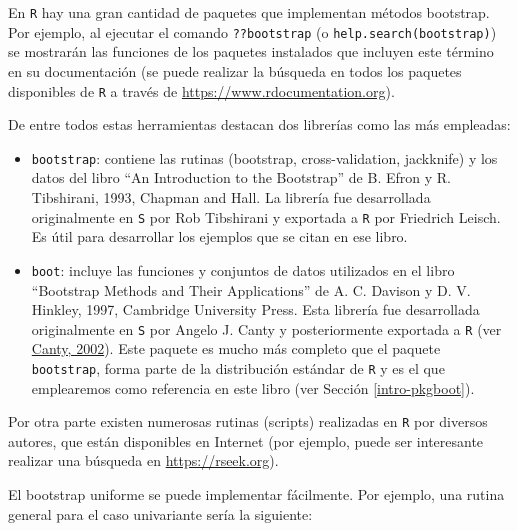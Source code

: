 \documentclass[
  10pt,
]{book}
\theoremstyle{break}
\theoremstyle{nonumberplain}
\begin{document}
En \texttt{R} hay una gran cantidad de paquetes que implementan métodos bootstrap.
Por ejemplo, al ejecutar el comando \texttt{??bootstrap} (o \texttt{help.search(\textquotesingle{}bootstrap\textquotesingle{})})
se mostrarán las funciones de los paquetes instalados que incluyen este término
en su documentación (se puede realizar la búsqueda en todos los paquetes disponibles
de \texttt{R} a través de \url{https://www.rdocumentation.org}).

De entre todos estas herramientas destacan dos librerías
como las más empleadas:

\begin{itemize}
\item
  \texttt{bootstrap}: contiene las rutinas (bootstrap, cross-validation,
  jackknife) y los datos del libro ``An Introduction to the Bootstrap'' de B.
  Efron y R. Tibshirani, 1993, Chapman and Hall. La librería fue
  desarrollada originalmente en \texttt{S} por Rob Tibshirani y exportada a \texttt{R} por
  Friedrich Leisch. Es útil para desarrollar los ejemplos que se citan en
  ese libro.
\item
  \texttt{boot}: incluye las funciones y conjuntos de datos utilizados en el libro
  ``Bootstrap Methods and Their Applications'' de A. C. Davison y D. V. Hinkley, 1997,
  Cambridge University Press. Esta librería fue desarrollada originalmente
  en \texttt{S} por Angelo J. Canty y posteriormente exportada a \texttt{R} (ver \href{http://cran.fhcrc.org/doc/Rnews/Rnews_2002-3.pdf}{Canty, 2002}).
  Este paquete es mucho más completo que el paquete \texttt{bootstrap}, forma parte de la distribución estándar de \texttt{R} y es el que emplearemos como referencia en este libro (ver Sección \ref{intro-pkgboot}).
\end{itemize}

Por otra parte existen numerosas rutinas (scripts) realizadas en \texttt{R} por
diversos autores, que están disponibles en Internet
(por ejemplo, puede ser interesante realizar una búsqueda en
\url{https://rseek.org}).

El bootstrap uniforme se puede implementar fácilmente. Por ejemplo,
una rutina general para el caso univariante sería la siguiente:
\end{document}
